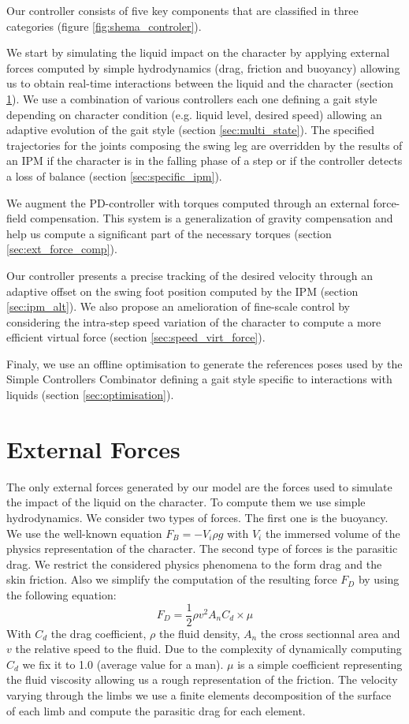 \documentclass[conference]{acmsiggraph}
\begin{document}
Our controller consists of five key components that are classified in three categories (figure \ref{fig:shema_controler}).

We start by simulating the liquid impact on the character by applying external forces computed by simple hydrodynamics (drag, friction and buoyancy) allowing us to obtain real-time interactions between the liquid and the character (section \ref{sec:ext_forces}).
We use a combination of various controllers each one defining a gait style depending on character condition (e.g. liquid level, desired speed) allowing an adaptive evolution of the gait style (section \ref{sec:multi_state}). The specified trajectories for the joints composing the swing leg are overridden by the results of an IPM if the character is in the falling phase of a step or if the controller detects a loss of balance (section \ref{sec:specific_ipm}).

We augment the PD-controller with torques computed through an external force-field compensation. This system is a generalization of \cite{coros2010generalized} gravity compensation and help us compute a significant part of the necessary torques (section \ref{sec:ext_force_comp}).

Our controller presents a precise tracking of the desired velocity through an adaptive offset on the swing foot position computed by the IPM (section \ref{sec:ipm_alt}). We also propose an amelioration of \cite{coros2010generalized} fine-scale control by considering the intra-step speed variation of the character to compute a more efficient virtual force  (section \ref{sec:speed_virt_force}).

Finaly, we use an offline optimisation to generate the references poses used by the Simple Controllers Combinator defining a gait style specific to interactions with liquids (section \ref{sec:optimisation}).


\section{External Forces}
\label{sec:ext_forces}

The only external forces generated by our model are the forces used to simulate the impact of the liquid on the character.
To compute them we use simple hydrodynamics. We consider two types of forces. The first one is the buoyancy. We use the well-known equation $F_{B}=-V_i \rho g$ with $V_i$ the immersed volume of the physics representation of the character.
The second type of forces is the parasitic drag. We restrict the considered physics phenomena to the form drag and the skin friction. Also we simplify the computation of the resulting force $F_D$ by using the following equation:
$$
F_D=\frac{1}{2} \rho v^2 A_n C_d \times \mu
$$
With \(C_d\) the drag coefficient, \(\rho\) the fluid density, \(A_n\) the cross sectionnal area and \(v\) the relative speed to the fluid. Due to the complexity of dynamically computing $C_d$ we fix it to 1.0 (average value for a man). $\mu$ is a simple coefficient representing the fluid viscosity allowing us a rough representation of the friction. The velocity varying through the limbs we use a finite elements decomposition of the surface of each limb and compute the parasitic drag for each element.
\end{document}
